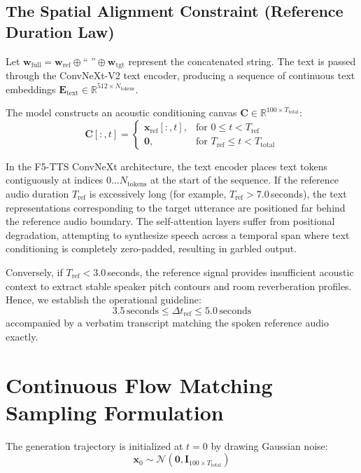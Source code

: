 \subsection{The Spatial Alignment Constraint (Reference Duration Law)}
Let $\mathbf{w}_{\text{full}} = \mathbf{w}_{\text{ref}} \oplus \text{`` ''} \oplus \mathbf{w}_{\text{tgt}}$ represent the concatenated string. The text is passed through the ConvNeXt-V2 text encoder, producing a sequence of continuous text embeddings $\mathbf{E}_{\text{text}} \in \mathbb{R}^{512 \times N_{\text{tokens}}}$. 

The model constructs an acoustic conditioning canvas $\mathbf{C} \in \mathbb{R}^{100 \times T_{\text{total}}}$:
\begin{equation}
    \mathbf{C}[:, t] = 
    \begin{cases}
        \mathbf{x}_{\text{ref}}[:, t], & \text{for } 0 \le t < T_{\text{ref}} \\
        \mathbf{0}, & \text{for } T_{\text{ref}} \le t < T_{\text{total}}
    \end{cases}
    \label{eq:acoustic_canvas}
\end{equation}

\begin{remark}
In the F5-TTS ConvNeXt architecture, the text encoder places text tokens contiguously at indices $0 \dots N_{\text{tokens}}$ at the start of the sequence. If the reference audio duration $T_{\text{ref}}$ is excessively long (for example, $T_{\text{ref}} > 7.0$\,seconds), the text representations corresponding to the target utterance are positioned far behind the reference audio boundary. The self-attention layers suffer from positional degradation, attempting to synthesize speech across a temporal span where text conditioning is completely zero-padded, resulting in garbled output.

Conversely, if $T_{\text{ref}} < 3.0$\,seconds, the reference signal provides insufficient acoustic context to extract stable speaker pitch contours and room reverberation profiles. Hence, we establish the operational guideline:
\begin{equation}
    3.5\,\text{seconds} \le \Delta t_{\text{ref}} \le 5.0\,\text{seconds}
    \label{eq:reference_duration_law}
\end{equation}
accompanied by a verbatim transcript matching the spoken reference audio exactly.
\end{remark}

\section{Continuous Flow Matching Sampling Formulation}
The generation trajectory is initialized at $t=0$ by drawing Gaussian noise:
\begin{equation}
    \mathbf{x}_0 \sim \mathcal{N}(\mathbf{0}, \mathbf{I}_{100 \times T_{\text{total}}})
    \label{eq:gaussian_init}
\end{equation}

